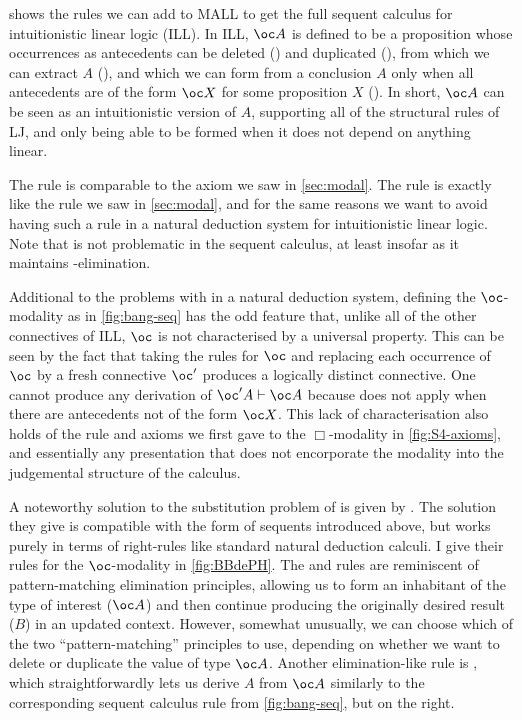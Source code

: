  shows the rules we can add to MALL to get the full sequent
calculus for intuitionistic linear logic (ILL).
In ILL, $\oc A$ is defined
to be a proposition whose occurrences as antecedents can be deleted
() and duplicated (), from which we can
extract $A$ (), and which we can form from a conclusion
$A$ only when all antecedents are of the form $\oc X$ for some proposition $X$
().
In short, $\oc A$ can be seen as an intuitionistic version of $A$, supporting
all of the structural rules of LJ, and only being able to be formed when it
does not depend on anything linear.

The  rule is comparable to the  axiom we saw in
\cref{sec:modal}.
The  rule is exactly like the  rule we saw
in \cref{sec:modal}, and for the same reasons we want to avoid having such a
rule in a natural deduction system for intuitionistic linear logic.
Note that  is not problematic in the sequent calculus, at
least insofar as it maintains -elimination.

Additional to the problems with  in a natural deduction
system, defining the $\oc$-modality as in \cref{fig:bang-seq} has the odd
feature that, unlike all of the other connectives of ILL, $\oc$ is not
characterised by a universal property.
This can be seen by the fact that taking the rules for $\oc$ and replacing each
occurrence of $\oc$ by a fresh connective $\oc'$ produces a logically distinct
connective.
One cannot produce any derivation of $\oc' A \vdash \oc A$ because
 does not apply when there are antecedents not of the form
$\oc X$.
This lack of characterisation also holds of the rule and axioms we first gave to
the $\Box$-modality in \cref{fig:S4-axioms}, and essentially any presentation
that does not encorporate the modality into the judgemental structure of the
calculus.

A noteworthy solution to the substitution problem of  is
given by \citet{BBdePH93}.
The solution they give is compatible with the form of sequents introduced above,
but works purely in terms of right-rules like standard natural deduction
calculi.
I give their rules for the $\oc$-modality in \cref{fig:BBdePH}.
The  and  rules are reminiscent of
pattern-matching elimination principles, allowing us to form an inhabitant of
the type of interest ($\oc A$) and then continue producing the originally
desired result ($B$) in an updated context.
However, somewhat unusually, we can choose which of the two ``pattern-matching''
principles to use, depending on whether we want to delete or duplicate the
value of type $\oc A$.
Another elimination-like rule is , which straightforwardly
lets us derive $A$ from $\oc A$ similarly to the corresponding sequent calculus
rule from \cref{fig:bang-seq}, but on the right.

